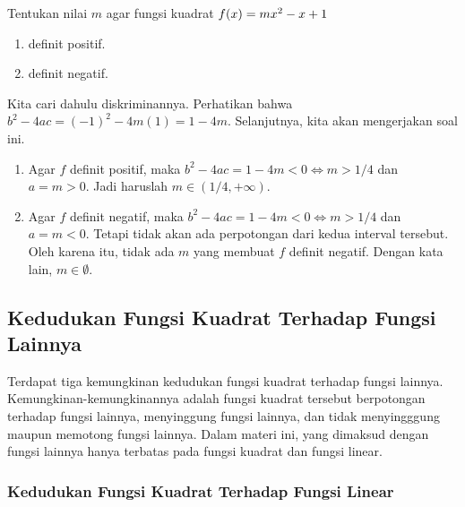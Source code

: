 	\begin{contoh}
		Tentukan nilai $ m $ agar fungsi kuadrat $ \mathop{}\!{f}{\left({x}\right)} = mx^{2} - x + 1 $
		\begin{enumerate}
			\item definit positif.
			\item definit negatif.
		\end{enumerate}
	\end{contoh}
	\begin{jawab}
		Kita cari dahulu diskriminannya. Perhatikan bahwa $ b^{2} - 4ac = \left(-1\right)^{2} - 4m\left(1\right) = 1 - 4m $. Selanjutnya, kita akan mengerjakan soal ini.
		\begin{enumerate}
			\item Agar $ f $ definit positif, maka $ b^{2} - 4ac = 1 - 4m < 0 \iff m > 1/4 $ dan $ a = m > 0 $. Jadi haruslah $ m \in \left(1/4, +\infty\right) $.
			\item Agar $ f $ definit negatif, maka $ b^{2} - 4ac = 1 - 4m < 0 \iff m > 1/4 $ dan $ a = m < 0 $. Tetapi tidak akan ada perpotongan dari kedua interval tersebut. Oleh karena itu, tidak ada $ m $ yang membuat $ f $ definit negatif. Dengan kata lain, $ m \in \emptyset $.
		\end{enumerate}
	\end{jawab}
	
\subsection{Kedudukan Fungsi Kuadrat Terhadap Fungsi Lainnya}
	
	Terdapat tiga kemungkinan kedudukan fungsi kuadrat terhadap fungsi lainnya. Kemungkinan-kemungkinannya adalah fungsi kuadrat tersebut berpotongan terhadap fungsi lainnya, menyinggung fungsi lainnya, dan tidak menyingggung maupun memotong fungsi lainnya. Dalam materi ini, yang dimaksud dengan fungsi lainnya hanya terbatas pada fungsi kuadrat dan fungsi linear.
	
	\subsubsection{Kedudukan Fungsi Kuadrat Terhadap Fungsi Linear}
	
